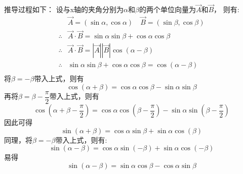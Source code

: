 \documentclass[a4paper, 12pt, draft]{article}
\begin{document}
    推导过程如下：
    设与x轴的夹角分别为$\alpha$和$\beta$的两个单位向量为$\vec{A}$和$\vec{B}$，
    则有:
    \[
    \begin{aligned}
        &\vec{A} = (\sin{\alpha}, \cos{\alpha}) \quad \vec{B} = (\sin{\beta}, \cos{\beta})     \\
        \therefore &\vec{A} \cdot \vec{B} = \sin{\alpha}\sin{\beta} + \cos{\alpha}\cos{\beta}  \\
        \therefore &\vec{A} \cdot \vec{B} = |\vec{A}||\vec{B}|\cos{(\alpha - \beta)}           \\
        \therefore &\sin{\alpha}\sin{\beta} + \cos{\alpha}\cos{\beta} = \cos{(\alpha - \beta)} \\
    \end{aligned}
    \]
    将$\beta = -\beta$带入上式，则有
    \begin{equation}\label{2.3}
        \cos{(\alpha + \beta)} = \cos{\alpha}\cos{\beta} - \sin{\alpha}\sin{\beta}
    \end{equation}
    再将$\beta = \beta - \dfrac{\pi}{2}$带入上式，则有
    \[
    \cos{(\alpha + \beta - \dfrac{\pi}{2})} = \cos{\alpha}\cos{(\beta - \dfrac{\pi}{2})} - \sin{\alpha}\sin{(\beta - \dfrac{\pi}{2})}
    \]
    因此可得
    \begin{equation}\label{2.4}
        \sin{(\alpha + \beta)} = \cos{\alpha}\sin{\beta} + \sin{\alpha}\cos(\beta)
    \end{equation}
    同理，将$\beta = -\beta$带入上式，则有:
    \[
    \sin{(\alpha - \beta)} = \cos{\alpha}\sin{(-\beta)}+\sin{\alpha}\cos{(-\beta)}
    \]
    易得
    \begin{equation}\label{2.5}
        \sin{(\alpha - \beta)} = \sin{\alpha}\cos{\beta} - \cos{\alpha}\sin{\beta}
    \end{equation}
    
\end{document}
